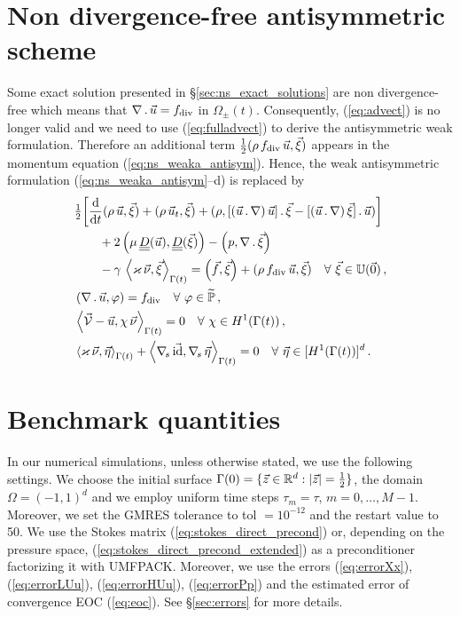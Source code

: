 \section{Non divergence-free antisymmetric scheme}
Some exact solution presented in \S\ref{sec:ns_exact_solutions} are non
divergence-free which means that $\nabla\,.\,\vec u = f_{\rm{div}}$ in
$\Omega_\pm(t)$. Consequently, (\ref{eq:advect}) is no longer valid and we need
to use (\ref{eq:fulladvect}) to derive the antisymmetric weak formulation.
Therefore an additional term $\tfrac{1}{2}(\rho\,f_{\rm{div}}\,\vec
u,\vec\xi)$ appears in the momentum equation (\ref{eq:ns_weaka_antisym}).
Hence, the weak antisymmetric formulation (\ref{eq:ns_weaka_antisym}--d) is
replaced by
\begin{subequations}
\begin{align}
& \tfrac{1}{2}\bigg[ \ddt (\rho\,\vec u, \vec \xi) + (\rho\,\vec u_t, \vec \xi)
+ (\rho, [(\vec u\,.\,\nabla)\,\vec u]\,.\,\vec \xi
- [(\vec u\,.\,\nabla)\,\vec \xi]\,.\,\vec u) \bigg] \nonumber \\
& \qquad +2\left(\mu\,\mat D(\vec u), \mat D(\vec \xi)\right)
- \left(p, \nabla\,.\,\vec \xi\right)\nonumber \\
& \qquad - \gamma\,\left\langle \varkappa\,\vec\nu, \vec\xi
\right\rangle_{\Gamma(t)}
= \left(\vec f, \vec \xi\right)+(\rho\,f_{\rm{div}}\,\vec u,\vec\xi)
\quad \forall\ \vec\xi \in \uspace 0 \,,
\label{eq:ns_weaka_antisym_div}\\
& \left(\nabla\,.\,\vec u, \varphi\right) = f_{\rm{div}}
\quad \forall\ \varphi \in \pnormspace\,, \label{eq:ns_weakb_antisym_div} \\
&  \left\langle \V
- \vec u, \chi\,\vec\nu \right\rangle_{\Gamma(t)} = 0
\quad \forall\ \chi \in H^1(\Gamma(t))\,, \label{eq:ns_weakc_antisym_div} \\
& \left\langle \varkappa\,\vec\nu, \vec\eta \right\rangle_{\Gamma(t)}
+ \left\langle \nabs\,\vec \id, \nabs\,\vec \eta \right\rangle_{\Gamma(t)}
= 0  \quad \forall\ \vec\eta \in
[H^1(\Gamma(t))]^d\,.\label{eq:ns_weakd_antisym_div}
\end{align}
\end{subequations}

\section{Benchmark quantities}\label{sec:benchmark_quantities}
In our numerical simulations, unless otherwise stated, we use the following
settings. We choose the initial surface $\Gamma(0) = \{ \vec z \in \mathbb R^d : |\vec
z| = \frac12 \}$, the domain $\Omega = (-1,1)^d$ and we employ uniform time
steps $\tau_m=\tau$, $m=0,\ldots, M-1$. Moreover, we set the GMRES tolerance to
tol $=10^{-12}$ and the restart value to 50. We use the Stokes matrix
(\ref{eq:stokes_direct_precond}) or, depending on the pressure space,
(\ref{eq:stokes_direct_precond_extended}) as a preconditioner factorizing it
with UMFPACK. Moreover, we use the errors (\ref{eq:errorXx}),
(\ref{eq:errorLUu}), (\ref{eq:errorHUu}), (\ref{eq:errorPp}) and the estimated
error of convergence EOC (\ref{eq:eoc}). See \S\ref{sec:errors} for more
details.

